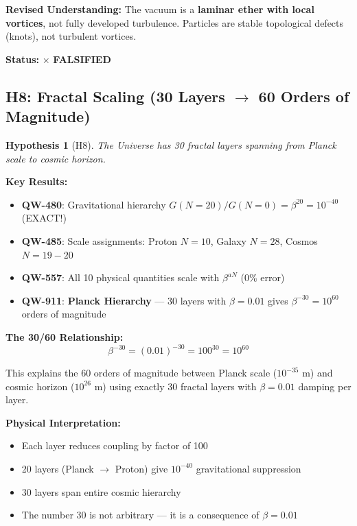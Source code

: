 \documentclass[11pt, a4paper]{article}
\newtheorem{hypothesis}{Hypothesis}[section]
\theoremstyle{remark}
\newcommand{\QW}[1]{\textbf{QW-#1}}
\begin{document}
\textbf{Revised Understanding:}
The vacuum is a \textbf{laminar ether with local vortices}, not fully developed turbulence. Particles are stable topological defects (knots), not turbulent vortices.

\textbf{Status:} $\times$ \textbf{FALSIFIED}

\subsection{H8: Fractal Scaling (30 Layers $\to$ 60 Orders of Magnitude)}

\begin{hypothesis}[H8]
The Universe has 30 fractal layers spanning from Planck scale to cosmic horizon.
\end{hypothesis}

\textbf{Key Results:}
\begin{itemize}
    \item \QW{480}: Gravitational hierarchy $G(N=20)/G(N=0) = \beta^{20} = 10^{-40}$ (EXACT!)
    \item \QW{485}: Scale assignments: Proton $N=10$, Galaxy $N=28$, Cosmos $N=19-20$
    \item \QW{557}: All 10 physical quantities scale with $\beta^{aN}$ (0\% error)
    \item \QW{911}: \textbf{Planck Hierarchy} --- 30 layers with $\beta = 0.01$ gives $\beta^{-30} = 10^{60}$ orders of magnitude
\end{itemize}

\textbf{The 30/60 Relationship:}
\begin{equation}
\boxed{\beta^{-30} = (0.01)^{-30} = 100^{30} = 10^{60}}
\end{equation}

This explains the 60 orders of magnitude between Planck scale ($10^{-35}$ m) and cosmic horizon ($10^{26}$ m) using exactly 30 fractal layers with $\beta = 0.01$ damping per layer.

\textbf{Physical Interpretation:}
\begin{itemize}
    \item Each layer reduces coupling by factor of 100
    \item 20 layers (Planck $\to$ Proton) give $10^{-40}$ gravitational suppression
    \item 30 layers span entire cosmic hierarchy
    \item The number 30 is not arbitrary --- it is a consequence of $\beta = 0.01$
\end{itemize}
\end{document}
